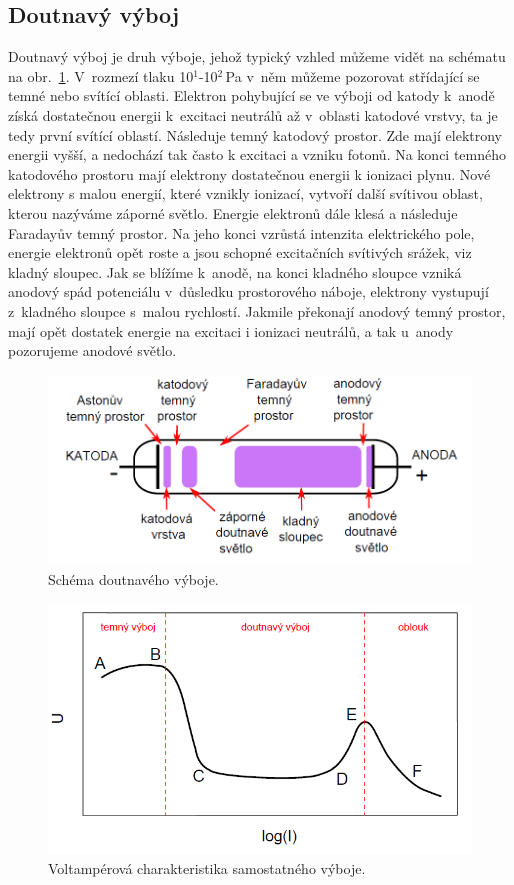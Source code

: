 \documentclass[a4paper,12pt]{article}
\begin{document}
\subsection{Doutnavý výboj}
Doutnavý výboj je druh výboje, jehož typický vzhled můžeme vidět na schématu na 
obr.~\ref{glowdischarge}. V~rozmezí tlaku 10$^1$-10$^2$\,\si{\pascal} v~něm 
můžeme 
pozorovat střídající se temné nebo svítící oblasti. Elektron pohybující se ve 
výboji od katody k~anodě získá dostatečnou energii k~excitaci neutrálů až 
v~oblasti katodové vrstvy, ta je tedy první svítící oblastí. Následuje temný 
katodový prostor. Zde mají elektrony energii vyšší, a nedochází tak často k 
excitaci a vzniku fotonů. Na konci temného katodového prostoru mají elektrony 
dostatečnou energii k ionizaci plynu. Nové elektrony s malou energií, které 
vznikly ionizací, vytvoří další svítivou oblast, kterou nazýváme záporné 
světlo. Energie elektronů dále klesá a následuje Faradayův temný prostor. Na 
jeho konci vzrůstá intenzita elektrického pole, energie elektronů opět roste a 
jsou schopné excitačních svítivých srážek, viz kladný sloupec. Jak se blížíme 
k~anodě, na konci kladného sloupce vzniká anodový spád potenciálu v~důsledku 
prostorového náboje, elektrony vystupují z~kladného sloupce s~malou rychlostí. 
Jakmile překonají anodový temný prostor, mají opět dostatek energie na excitaci 
i ionizaci neutrálů, a tak u~anody pozorujeme anodové světlo.

\begin{figure}[h]
	\centering
	\includegraphics[width=130mm]{glowdischarge.png}
	\caption{Schéma doutnavého výboje.}
	\label{glowdischarge}
\end{figure}

\begin{figure}[h]
	\centering
	\includegraphics[width=130mm]{VA.png}
	\caption{Voltampérová charakteristika samostatného výboje.}
	\label{VA}
\end{figure}
\end{document}
